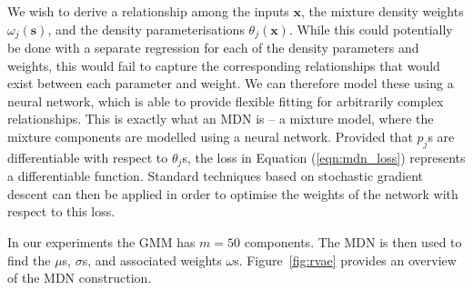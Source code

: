

\iffalse
{}


We wish to derive a relationship among the inputs $\textbf{x}$, the mixture density weights $\omega_{j}(\textbf{s})$, and the density parameterisations $\theta_{j}(\textbf{x})$. While this could potentially be done with a separate regression for each of the density parameters and weights, this would fail to capture the corresponding relationships that would exist between each parameter and weight. %
We can therefore model these using a neural network, which is able to provide flexible fitting for arbitrarily complex relationships. %
This is exactly what an MDN is -- a mixture model, where the mixture components are modelled using a neural network. Provided that $p_{j}$s are differentiable with respect to $\theta_{j}$s, the loss in Equation (\ref{eqn:mdn_loss}) represents a differentiable function. Standard techniques based on stochastic gradient descent can then be applied in order to optimise the weights of the network with respect to this loss.

In our experiments the GMM has $m=50$ components. The MDN is then used to find the $\mu$s, $\sigma$s, and associated weights $\omega$s. Figure~\ref{fig:rvae} provides an overview of the MDN construction. 

